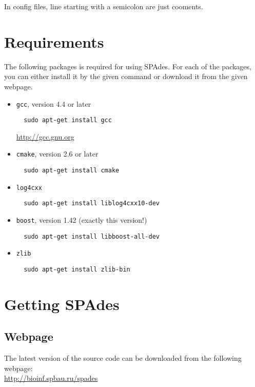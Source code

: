 \documentclass{article}
\def\spades{SPAdes}
\begin{document}
In config files, line starting with a semicolon are just cooments.


\section{Requirements}\label{section:requirements}
The following packages is required for using {\spades}.
For each of the packages, you can either install it by 
the given command or download it from the given webpage.

\begin{itemize}
  \item {\tt gcc}, version 4.4 or later
  \begin{lstlisting}
  sudo apt-get install gcc
  \end{lstlisting}
  \url{http://gcc.gnu.org}

  \item {\tt cmake}, version 2.6 or later
  \begin{lstlisting}
  sudo apt-get install cmake
  \end{lstlisting}

  \item {\tt log4cxx}
  \begin{lstlisting}
  sudo apt-get install liblog4cxx10-dev
  \end{lstlisting}

  \item {\tt boost}, version 1.42 (exactly this version!)
  \begin{lstlisting}
  sudo apt-get install libboost-all-dev
  \end{lstlisting}

  \item {\tt zlib}
  \begin{lstlisting}
  sudo apt-get install zlib-bin
  \end{lstlisting}
\end{itemize}


\section{Getting {\spades}}
\subsection{Webpage}
The latest version of the source code can be downloaded from the 
following webpage:\\
\url{http://bioinf.spbau.ru/spades}
\end{document}
